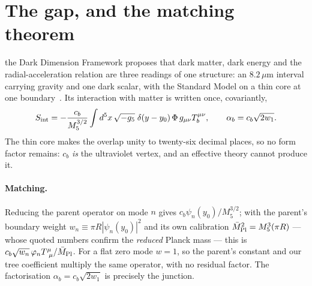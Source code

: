 \begin{abstract}
above $0.67$, and the two groups do not overlap. \textbf{Reaching the window is therefore a property of a subclass selected by the fibration, not of one member} --- but the position along the flat directions is not fixed on any member, and this paper does not claim it is. The last step --- fixing the position along the flat directions --- requires string-loop coefficients that are not computable for a general Calabi--Yau, and applying the published functional form for this class shows the minimum tending to the boundary of the K\"ahler cone. The coupling is therefore not fixed. What survives is an angle-independent sum rule: the two light states are experimentally indistinguishable, so the fifth-force observable is $\alpha_b^2+\alpha_b'^2=2w_1|\vec p|^2$, which requires no loop coefficient at all.
\end{abstract}

\section{The gap, and the matching theorem}
the Dark Dimension Framework proposes that dark matter, dark energy and the radial-acceleration relation are three readings of one structure: an $8.2\,\mu$m interval carrying gravity and one dark scalar, with the Standard Model on a thin core at one boundary~\cite{DDF1,DDF2,DDF3,DDF4}. Its interaction with matter is written once, covariantly,
\begin{equation}
S_{\rm int}=-\frac{c_b}{M_5^{3/2}}\int d^5x\,\sqrt{-g_5}\;\delta(y-y_0)\,\Phi\,g_{\mu\nu}T^{\mu\nu}_b,
\qquad \alpha_b=c_b\sqrt{2w_1}.
\end{equation}
The thin core makes the overlap unity to twenty-six decimal places, so no form factor remains: $c_b$ \emph{is} the ultraviolet vertex, and an effective theory cannot produce it.

\paragraph{Matching.} Reducing the parent operator on mode $n$ gives $c_b\psi_n(y_0)/M_5^{3/2}$; with the parent's boundary weight $w_n\equiv\pi R|\psi_n(y_0)|^2$ and its own calibration $\bar M_{\rm Pl}^2=M_5^3(\pi R)$ --- whose quoted numbers confirm the \emph{reduced} Planck mass --- this is $c_b\sqrt{w_n}\,\varphi_nT^\mu_{\ \mu}/\bar M_{\rm Pl}$. For a flat zero mode $w=1$, so the parent's constant and our tree coefficient multiply the same operator, with no residual factor. The factorisation $\alpha_b=c_b\sqrt{2w_1}$ is precisely the junction.

